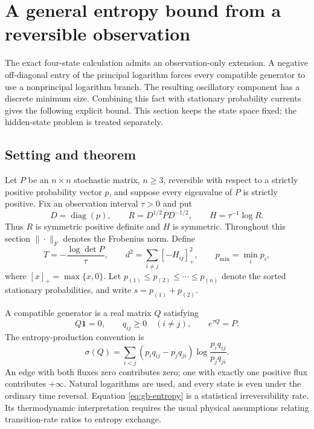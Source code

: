 \section{A general entropy bound from a reversible observation}
\label{sec:general-bound}

The exact four-state calculation admits an observation-only extension. A
negative off-diagonal entry of the principal logarithm forces every
compatible generator to use a nonprincipal logarithm branch. The resulting
oscillatory component has a discrete minimum size. Combining this fact
with stationary probability currents gives the following explicit bound.
This section keeps the state space fixed; the hidden-state problem is
treated separately.

\subsection{Setting and theorem}

Let $P$ be an $n\times n$ stochastic matrix, $n\geq3$, reversible with
respect to a strictly positive probability vector $p$, and suppose every
eigenvalue of $P$ is strictly positive. Fix an observation interval
$\tau>0$ and put
\[
 D=\operatorname{diag}(p),\qquad
 R=D^{1/2}PD^{-1/2},\qquad
 H=\tau^{-1}\log R.
\]
Thus $R$ is symmetric positive definite and $H$ is symmetric. Throughout
this section $\|\cdot\|_F$ denotes the Frobenius norm. Define
\begin{equation}
 T=-\frac{\log\det P}{\tau},\qquad
 d^2=\sum_{i\ne j}[-H_{ij}]_+^2,\qquad
 p_{\min}=\min_i p_i,
 \label{eq:gb-data}
\end{equation}
where $[x]_+=\max\{x,0\}$. Let
$p_{(1)}\leq p_{(2)}\leq\cdots\leq p_{(n)}$ denote the sorted
stationary probabilities, and write $s=p_{(1)}+p_{(2)}$.

A compatible generator is a real matrix $Q$ satisfying
\[
 Q\mathbf1=0,\qquad q_{ij}\geq0\quad(i\ne j),\qquad
 e^{\tau Q}=P.
\]
The entropy-production convention is
\begin{equation}
 \sigma(Q)=\sum_{i<j}
 (p_iq_{ij}-p_jq_{ji})
 \log\frac{p_iq_{ij}}{p_jq_{ji}}.
 \label{eq:gb-entropy}
\end{equation}
An edge with both fluxes zero contributes zero; one with exactly one
positive flux contributes $+\infty$. Natural logarithms are used, and
every state is even under the ordinary time reversal. Equation
\eqref{eq:gb-entropy} is a statistical irreversibility rate. Its
thermodynamic interpretation requires the usual physical assumptions
relating transition-rate ratios to entropy exchange.

